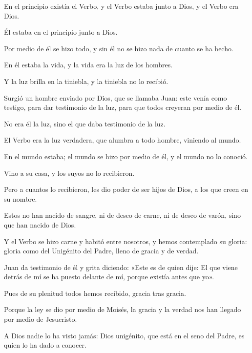 		
		 
		
		
		\begin{scripture}
			En el principio existía el Verbo, y el Verbo estaba junto a Dios, y el Verbo era Dios.
			
			Él estaba en el principio junto a Dios.
			
			Por medio de él se hizo todo, y sin él no se hizo nada de cuanto se ha hecho.
			
			En él estaba la vida, y la vida era la luz de los hombres.
			
			Y la luz brilla en la tiniebla, y la tiniebla no lo recibió.
			
			Surgió un hombre enviado por Dios, que se llamaba Juan: este venía como testigo, para dar testimonio de la luz, para que todos creyeran por medio de él.
			
			No era él la luz, sino el que daba testimonio de la luz.
			
			El Verbo era la luz verdadera, que alumbra a todo hombre, viniendo al mundo.
			
			En el mundo estaba; el mundo se hizo por medio de él, y el mundo no lo conoció.
			
			Vino a su casa, y los suyos no lo recibieron.
			
			Pero a cuantos lo recibieron, les dio poder de ser hijos de Dios, a los que creen en su nombre.
			
			Estos no han nacido de sangre, ni de deseo de carne, ni de deseo de varón, sino que han nacido de Dios.
			
			Y el Verbo se hizo carne y habitó entre nosotros, y hemos contemplado su gloria: gloria como del Unigénito del Padre, lleno de gracia y de verdad.
			
			Juan da testimonio de él y grita diciendo: «Este es de quien dije: El que viene detrás de mí se ha puesto delante de mí, porque existía antes que yo».
			
			Pues de su plenitud todos hemos recibido, gracia tras gracia.
			
			Porque la ley se dio por medio de Moisés, la gracia y la verdad nos han llegado por medio de Jesucristo.
			
			A Dios nadie lo ha visto jamás: Dios unigénito, que está en el seno del Padre, es quien lo ha dado a conocer.
		\end{scripture}
	
